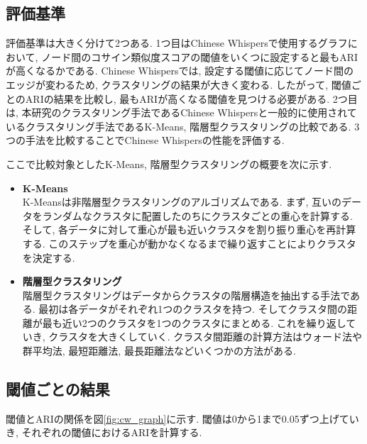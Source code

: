 \subsection{評価基準}
評価基準は大きく分けて2つある. 
1つ目はChinese Whispersで使用するグラフにおいて, ノード間のコサイン類似度スコアの閾値をいくつに設定すると最もARIが高くなるかである. Chinese Whispersでは, 設定する閾値に応じてノード間のエッジが変わるため, クラスタリングの結果が大きく変わる. したがって, 閾値ごとのARIの結果を比較し, 最もARIが高くなる閾値を見つける必要がある. 
2つ目は, 本研究のクラスタリング手法であるChinese Whispersと一般的に使用されているクラスタリング手法であるK-Means, 階層型クラスタリングの比較である. 3つの手法を比較することでChinese Whispersの性能を評価する. 

ここで比較対象としたK-Means, 階層型クラスタリングの概要を次に示す. 

\begin{itemize}
  \item \textbf{K-Means}\\
  K-Meansは非階層型クラスタリングのアルゴリズムである. まず, 互いのデータをランダムなクラスタに配置したのちにクラスタごとの重心を計算する. そして, 各データに対して重心が最も近いクラスタを割り振り重心を再計算する. このステップを重心が動かなくなるまで繰り返すことによりクラスタを決定する. 

  \item \textbf{階層型クラスタリング}\\
  階層型クラスタリングはデータからクラスタの階層構造を抽出する手法である. 最初は各データがそれぞれ1つのクラスタを持つ. そしてクラスタ間の距離が最も近い2つのクラスタを1つのクラスタにまとめる. これを繰り返していき, クラスタを大きくしていく. クラスタ間距離の計算方法はウォード法や群平均法, 最短距離法, 最長距離法などいくつかの方法がある. 
\end{itemize}

\subsection{閾値ごとの結果}
閾値とARIの関係を図\ref{fig:cw_graph}に示す. 閾値は0から1まで0.05ずつ上げていき, それぞれの閾値におけるARIを計算する. 

